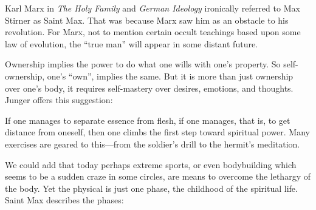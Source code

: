 Karl Marx in \emph{The Holy Family} and \emph{German Ideology} ironically referred to Max Stirner as Saint Max. That was because Marx saw him as an obstacle to his revolution. For Marx, not to mention certain occult teachings based upon some law of evolution, the ``true man'' will appear in some distant future.

Ownership implies the power to do what one wills with one's property. So self-ownership, one's ``own'', implies the same. But it is more than just ownership over one's body, it requires self-mastery over desires, emotions, and thoughts. Junger offers this suggestion:

\begin{quotex}
If one manages to separate essence from flesh, if one manages, that is, to get distance from oneself, then one climbs the first step toward spiritual power. Many exercises are geared to this---from the soldier's drill to the hermit's meditation.
\end{quotex}


We could add that today perhaps extreme sports, or even bodybuilding which seems to be a sudden craze in some circles, are means to overcome the lethargy of the body. Yet the physical is just one phase, the childhood of the spiritual life. Saint Max describes the phases:

